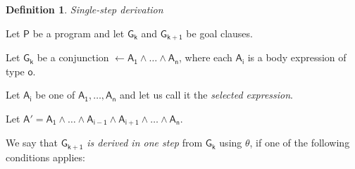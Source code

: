 \documentclass[inscr,ack,preface]{dithesis}
\theoremstyle{definition}
\newtheorem{definition}{Definition}[]
\newcommand{\msf}[1]{$\mathsf{#1}$}
\begin{document}
\begin{definition}{\emph{Single-step derivation}}

Let \msf{P} be a program and let \msf{G_{k}} and \msf{G_{k+1}} be goal clauses.

Let \msf{G_{k}} be a conjunction \msf{\leftarrow A_1 \land \dots \land A_n}, where each \msf{A_i} is a body expression of type \msf{o}.

Let \msf{A_i} be one of \msf{A_1, \ldots, A_n} and let us call it the \emph{selected expression}.

Let \msf{A' = A_1 \land \dots \land A_{i-1} \land A_{i+1} \land \dots \land A_n}.

We say that \msf{G_{k+1}} \emph{is derived in one step} from \msf{G_k} using \msf{\theta}, if one of the following conditions applies:


\end{definition}
\end{document}
